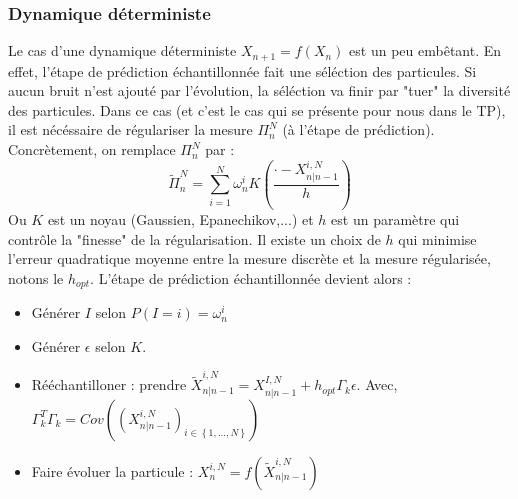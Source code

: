 \documentclass{article}
\begin{document}
\subsubsection{Dynamique déterministe}
Le cas d'une dynamique déterministe $X_{n+1}=f(X_n)$ est un peu embêtant. En effet, l'étape de prédiction
échantillonnée fait une séléction des particules. Si aucun bruit n'est ajouté par l'évolution, la séléction va finir par "tuer" la diversité des particules. 
Dans ce cas (et c'est le cas qui se présente pour nous dans le TP), il est nécéssaire de régulariser la mesure $\Pi_n^N$ (à l'étape de prédiction).
Concrètement, on remplace $\Pi_n^N$ par :
\[\tilde{\Pi}_n^N=\sum_{i=1}^N \omega_n^i K\left(\frac{\boldsymbol{\cdot}-X_{n \vert n-1}^{i,N}}{h}\right) \]  
Ou $K$ est un noyau (Gaussien, Epanechikov,...) et $h$ est un paramètre qui contrôle la "finesse" de la régularisation. Il existe un choix de $h$ qui minimise l'erreur quadratique moyenne entre la mesure discrète et la mesure régularisée, notons le $h_{opt}$.
\newline
L'étape de prédiction échantillonnée devient alors : 
\begin{itemize}
   \item Générer $I$ selon $P(I=i)=\omega^i_n$
   \item Générer $\epsilon$ selon $K$.
   \item Rééchantilloner : prendre $\tilde{X}^{i,N}_{n \vert n-1}=X^{I,N}_{n \vert n-1} + h_{opt}\Gamma_k \epsilon$. Avec, $\Gamma_k^{T}\Gamma_k=Cov\left((X_{n \vert n-1}^{i,N})_{i\in \left\{1,...,N\right\}}\right) $
   \item Faire évoluer la particule : $ X_{n}^{i,N}= f(\tilde{X}^{i,N}_{n \vert n-1})$
\end{itemize}
\end{document}
